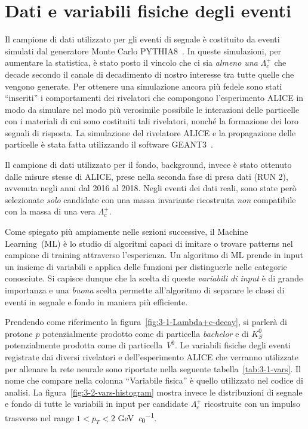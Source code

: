 \newpage

\section{Dati e variabili fisiche degli eventi}
    Il campione di dati utilizzato per gli eventi di segnale è costituito da eventi simulati dal generatore Monte Carlo PYTHIA8~\cite{PYTHIA8_2013_data_simul}. In queste simulazioni, per aumentare la statistica, è stato posto il vincolo che ci sia \textit{almeno una} $\Lambda_{c}^{+}$ che decade secondo il canale di decadimento di nostro interesse tra tutte quelle che vengono generate. Per ottenere una simulazione ancora più fedele sono stati ``inseriti'' i comportamenti dei rivelatori che compongono l’esperimento ALICE in modo da simulare nel modo più verosimile possibile le interazioni delle particelle con i materiali di cui sono costituiti tali rivelatori, nonché la formazione dei loro segnali di risposta. La simulazione del rivelatore ALICE e la propagazione delle particelle è stata fatta utilizzando il software GEANT3~\cite{GEANT3_1994}.

    Il campione di dati utilizzato per il fondo, background, invece è stato ottenuto dalle misure stesse di ALICE, prese nella seconda fase di presa dati (RUN 2), avvenuta negli anni dal 2016 al 2018. Negli eventi dei dati reali, sono state però selezionate \textit{solo} candidate con una massa invariante ricostruita \textit{non} compatibile con la massa di una vera $\Lambda_{c}^{+}$.
    
    Come spiegato più ampiamente nelle sezioni successive, il Machine Learning~(ML) è lo studio di algoritmi capaci di imitare o trovare patterns nel campione di training attraverso l’esperienza. Un algoritmo di ML prende in input un insieme di variabili e applica delle funzioni per distinguerle nelle categorie conosciute. Si capisce dunque che la scelta di queste \textit{variabili di input} è di grande importanza e una \textit{buona} scelta permette all’algoritmo di separare le classi di eventi in segnale e fondo in maniera più efficiente.
    
    Prendendo come riferimento la figura~\ref{fig:3-1-Lambda+c-decay}, si parlerà di protone $p$ potenzialmente prodotto come di particella \textit{bachelor} e di $K^{0}_{S}$ potenzialmente prodotta come di particella~$V^{0}$. Le variabili fisiche degli eventi registrate dai diversi rivelatori e dell’esperimento ALICE che verranno utilizzate per allenare la rete neurale sono riportate nella seguente tabella~\ref{tab:3-1-vars}. Il nome che compare nella colonna ``Variabile fisica'' è quello utilizzato nel codice di analisi. La figura~\ref{fig:3-2-vars-histogram} mostra invece le distribuzioni di segnale e fondo di tutte le variabili in input per candidate $\Lambda_{c}^{+}$ ricostruite con un impulso trasverso nel range $1 < p_{T} < 2$ \unit{\giga \eV \per \clight}.

